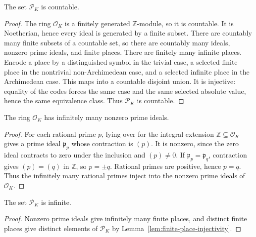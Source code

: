 \begin{lemma}\label{lem:number-field-places-countable}
\leanok
{}
The set $\mathcal P_K$ is countable.
\end{lemma}
\begin{proof}
The ring $\mathcal O_K$ is a finitely generated $\mathbb Z$-module,
so it is countable. It is Noetherian, hence every ideal is generated by
a finite subset. There are countably many finite subsets of a countable
set, so there are countably many ideals, nonzero prime ideals, and finite
places. There are finitely many infinite places. Encode a place by a
distinguished symbol in the trivial case, a selected finite place in the
nontrivial non-Archimedean case, and a selected infinite place in the
Archimedean case. This maps into a countable disjoint union. It is
injective: equality of the codes forces the same case and the same
selected absolute value, hence the same equivalence class. Thus
$\mathcal P_K$ is countable.
\end{proof}

\begin{lemma}\label{lem:number-field-primes-infinite}
\leanok
{}
The ring $\mathcal O_K$ has infinitely many nonzero prime ideals.
\end{lemma}
\begin{proof}
For each rational prime $p$, lying over for the integral extension
$\mathbb Z\subseteq\mathcal O_K$ gives a prime ideal $\mathfrak p_p$
whose contraction is $(p)$. It is nonzero, since the zero ideal contracts
to zero under the inclusion and $(p)\ne0$. If
$\mathfrak p_p=\mathfrak p_q$, contraction gives $(p)=(q)$ in
$\mathbb Z$, so $p=\pm q$. Rational primes are positive, hence $p=q$.
Thus the infinitely many rational primes inject into the nonzero prime
ideals of $\mathcal O_K$.
\end{proof}

\begin{corollary}\label{cor:number-field-places-infinite}
\leanok
{}
The set $\mathcal P_K$ is infinite.
\end{corollary}
\begin{proof}
Nonzero prime ideals give infinitely many finite places, and distinct
finite places give distinct elements of $\mathcal P_K$ by
Lemma~\ref{lem:finite-place-injectivity}.
\end{proof}

